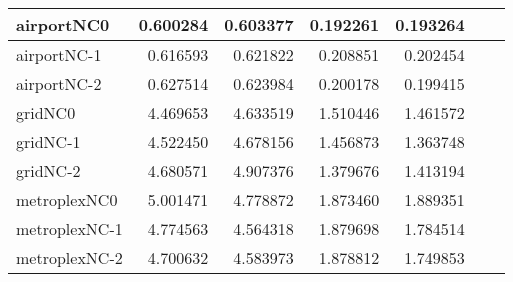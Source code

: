 \begin{longtable}{|l|r|r|r|r|r|r|}
airportNC0 & 0.600284 & 0.603377 & 0.192261 & 0.193264 \\ \hline
airportNC-1 & 0.616593 & 0.621822 & 0.208851 & 0.202454 \\ \hline
airportNC-2 & 0.627514 & 0.623984 & 0.200178 & 0.199415 \\ \hline
gridNC0 & 4.469653 & 4.633519 & 1.510446 & 1.461572 \\ \hline
gridNC-1 & 4.522450 & 4.678156 & 1.456873 & 1.363748 \\ \hline
gridNC-2 & 4.680571 & 4.907376 & 1.379676 & 1.413194 \\ \hline
metroplexNC0 & 5.001471 & 4.778872 & 1.873460 & 1.889351 \\ \hline
metroplexNC-1 & 4.774563 & 4.564318 & 1.879698 & 1.784514 \\ \hline
metroplexNC-2 & 4.700632 & 4.583973 & 1.878812 & 1.749853 \\ \hline
\end{longtable}
